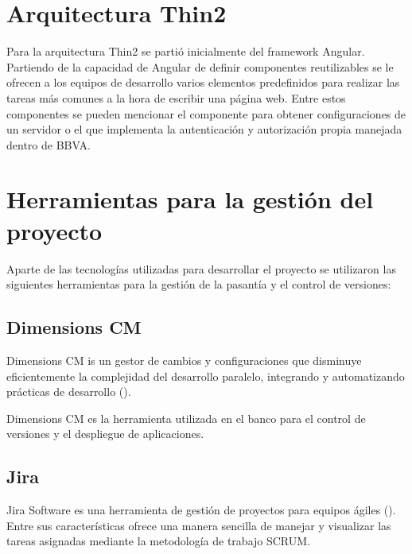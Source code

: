 \section{Arquitectura Thin2}

Para la arquitectura Thin2 se partió inicialmente del framework Angular. Partiendo
de la capacidad de Angular de definir componentes reutilizables se le ofrecen a los
equipos de desarrollo varios elementos predefinidos para realizar las tareas más
comunes a la hora de escribir una página web. Entre estos componentes se pueden
mencionar el componente para obtener configuraciones de un servidor o el que implementa
la autenticación y autorización propia manejada dentro de BBVA.

\section{Herramientas para la gestión del proyecto}

Aparte de las tecnologías utilizadas para desarrollar el proyecto se utilizaron
las siguientes herramientas para la gestión de la pasantía y el control de versiones:

\subsection{Dimensions CM}

Dimensions CM is un gestor de cambios y configuraciones que disminuye eficientemente
la complejidad del desarrollo paralelo, integrando y automatizando prácticas de desarrollo
(\cite{DIMENSIONS}).

Dimensions CM es la herramienta utilizada en el banco para el control de versiones y
el despliegue de aplicaciones.

\subsection{Jira}

Jira Software es una herramienta de gestión de proyectos para equipos ágiles (\cite{JIRA}).
Entre sus características ofrece una manera sencilla de manejar y visualizar
las tareas asignadas mediante la metodología de trabajo SCRUM.
